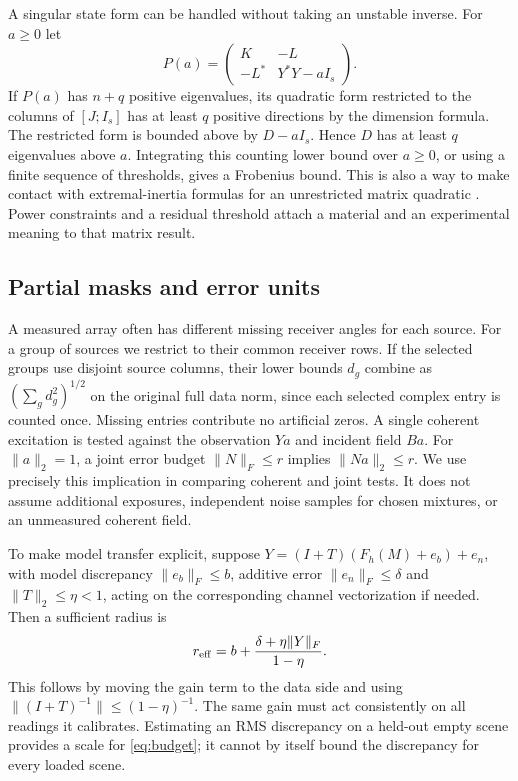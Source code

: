 \documentclass[anonymous,12pt]{iopjournal}
\theoremstyle{remark}\newtheorem{remark}[theorem]{Remark}
\numberwithin{equation}{section}
\begin{document}
A singular state form can be handled without taking an unstable inverse. For $a\ge0$ let
\begin{equation}
 P(a)=\begin{pmatrix}K&-L\\-L^*&Y^*Y-aI_s\end{pmatrix}.
\end{equation}
If $P(a)$ has $n+q$ positive eigenvalues, its quadratic form restricted to the columns of $[J;I_s]$ has at least $q$ positive directions by the dimension formula. The restricted form is bounded above by $D-aI_s$. Hence $D$ has at least $q$ eigenvalues above $a$. Integrating this counting lower bound over $a\ge0$, or using a finite sequence of thresholds, gives a Frobenius bound. This is also a way to make contact with extremal-inertia formulas for an unrestricted matrix quadratic \cite{tian}. Power constraints and a residual threshold attach a material and an experimental meaning to that matrix result.

\subsection{Partial masks and error units}
A measured array often has different missing receiver angles for each source. For a group of sources we restrict to their common receiver rows. If the selected groups use disjoint source columns, their lower bounds $d_g$ combine as $(\sum_g d_g^2)^{1/2}$ on the original full data norm, since each selected complex entry is counted once. Missing entries contribute no artificial zeros. A single coherent excitation is tested against the observation $Ya$ and incident field $Ba$. For $\|a\|_2=1$, a joint error budget $\|N\|_F\le r$ implies $\|Na\|_2\le r$. We use precisely this implication in comparing coherent and joint tests. It does not assume additional exposures, independent noise samples for chosen mixtures, or an unmeasured coherent field.

To make model transfer explicit, suppose $Y=(I+T)(F_h(M)+e_b)+e_n$, with model discrepancy $\|e_b\|_F\le b$, additive error $\|e_n\|_F\le\delta$ and $\|T\|_2\le\eta<1$, acting on the corresponding channel vectorization if needed. Then a sufficient radius is
\begin{equation}
 r_{\rm eff}=b+\frac{\delta+\eta\|Y\|_F}{1-\eta}.\label{eq:budget}
\end{equation}
This follows by moving the gain term to the data side and using $\|(I+T)^{-1}\|\le(1-\eta)^{-1}$. The same gain must act consistently on all readings it calibrates. Estimating an RMS discrepancy on a held-out empty scene provides a scale for \eqref{eq:budget}; it cannot by itself bound the discrepancy for every loaded scene.
\end{document}
